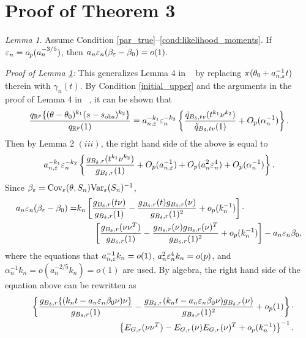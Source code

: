 \documentclass[9pt]{article}
\theoremstyle{remark}
\newtheorem{lemma}{Lemma}
\begin{document}
\pagebreak 
\section{Proof of Theorem 3}

\begin{lemma}\label{Alemma5} 
Assume Condition \ref{par_true}--\ref{cond:likelihood_moments}. If $\varepsilon_{n}=o_{p}(a_{n}^{-3/5})$, then $a_{n}\varepsilon_{n}(\beta_{\varepsilon}-\beta_{0})=o(1)$.
\end{lemma}
{\it Proof of Lemma \ref{Alemma5}:} 
	This generalizes Lemma 4 in ~\cite{Li2017} by replacing $\pi(\theta_{0}+a_{n,\varepsilon}^{-1}t)$
	therein with $\gamma_{n}(t)$. By Condition \ref{initial_upper} and the arguments in the proof
	of Lemma 4 in ~\cite{Li2017}, it can be shown that 
	\[
	\frac{q_{\mathbb{R}^{p}}\{(\theta-\theta_{0})^{k_{1}}(s-s_{\rm obs})^{k_{2}}\}}{q_{\mathbb{R}^{p}}(1)}=a_{n,\varepsilon}^{-k_{1}}\varepsilon_{n}^{-k_{2}}\left\{ \frac{\tilde{q}_{B_{\delta},tv}(t^{k_{1}}\nu^{k_{2}})}{\tilde{q}_{B_{\delta},tv}(1)}+O_{p}(\alpha_{n}^{-1})\right\} .
	\]
	Then by Lemma 2 $(iii)$, the right hand side of the above is equal
	to 
	\[
	a_{n,\varepsilon}^{-k_{1}}\varepsilon_{n}^{-k_{2}}\left\{ \frac{g_{B_{\delta},r}(t^{k_{1}}\nu^{k_{2}})}{g_{B_{\delta},r}(1)}+O_{p}(a_{n,\varepsilon}^{-1})+O_{p}(a_{n}^{2}\varepsilon_{n}^{4})+O_{p}(\alpha_{n}^{-1})\right\} .
	\]
	Since $\beta_{\varepsilon}=\text{Cov}_{\varepsilon}(\theta,S_{n})\text{Var}_{\varepsilon}(S_{n})^{-1}$,
	\begin{align*}
	a_{n}\varepsilon_{n}(\beta_{\varepsilon}-\beta_{0})= & k_{n}\left[\frac{g_{B_{\delta},r}(t\nu)}{g_{B_{\delta},r}(1)}-\frac{g_{B_{\delta},r}(t)g_{B_{\delta},r}(\nu)}{g_{B_{\delta},r}(1)^{2}}+o_{p}(k_{n}^{-1})\right]\cdot\\
	& \qquad\left[\frac{g_{B_{\delta},r}(\nu\nu^{T})}{g_{B_{\delta},r}(1)}-\frac{g_{B_{\delta},r}(\nu)g_{B_{\delta},r}(\nu)^{T}}{g_{B_{\delta},r}(1)^{2}}+o_{p}(k_{n}^{-1})\right]-a_{n}\varepsilon_{n}\beta_{0},
	\end{align*}
	where the equations that $a_{n,\varepsilon}^{-1}k_{n}=o(1)$, $a_{n}^{2}\varepsilon_{n}^{4}k_{n}=o(p)$,
	and $\alpha_{n}^{-1}k_{n}=o(a_{n}^{-2/5}k_{n})=o(1)$ are used. By
	algebra, the right hand side of the equation above can be rewritten
	as 
	\begin{eqnarray*}
		&  & \left\{ \frac{g_{B_{\delta},r}\{(k_{n}t-a_{n}\varepsilon_{n}\beta_{0}\nu)\nu\}}{g_{B_{\delta},r}(1)}-\frac{g_{B_{\delta},r}(k_{n}t-a_{n}\varepsilon_{n}\beta_{0}\nu)g_{B_{\delta},r}(\nu)}{g_{B_{\delta},r}(1)^{2}}+o_{p}(1)\right\} \cdot\\
		&  & \qquad\left\{ E_{G,r}(\nu\nu^{T})-E_{G,r}(\nu)E_{G,r}(\nu)^{T}+o_{p}(k_{n}^{-1})\right\} ^{-1}.
	\end{eqnarray*}
\end{document}
